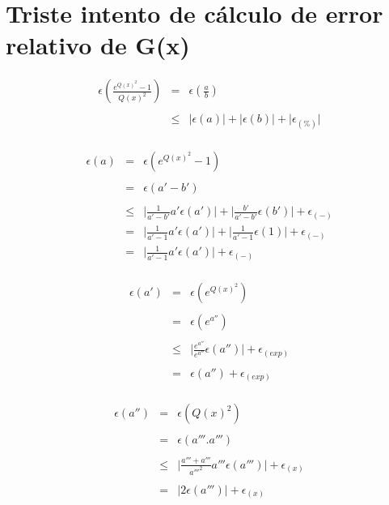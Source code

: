 \section{Triste intento de c\'alculo de error relativo de G(x)}

\begin{eqnarray}
\epsilon(\frac{e^{Q(x)^2}-1}{Q(x)^2}) & = & \epsilon(\frac{a}{b}) \nonumber \\
\nonumber \\
& \leq & \Big|\epsilon(a)\Big| + \Big|\epsilon(b)\Big| + \Big|\epsilon_{(\%)}\Big| \nonumber \\
\nonumber
\end{eqnarray}

\begin{eqnarray}
\epsilon(a) & = & \epsilon(e^{Q(x)^2} - 1) \nonumber \\
\nonumber \\
& = & \epsilon(a' - b') \nonumber \\
\nonumber \\
& \leq & \Big| \frac{1}{a' - b'} a' \epsilon(a') \Big| + \Big| \frac{b'}{a'-b'} \epsilon(b') \Big| + \epsilon_{(-)} \nonumber \\
\nonumber
& = & \Big| \frac{1}{a' - 1} a' \epsilon(a') \Big| + \Big| \frac{1}{a'-1} \epsilon(1) \Big| + \epsilon_{(-)} \nonumber \\
& = & \Big| \frac{1}{a' - 1} a' \epsilon(a') \Big| + \epsilon_{(-)} \nonumber \\
\nonumber
\end{eqnarray}

\begin{eqnarray}
\epsilon(a') & = & \epsilon( e^{Q(x)^2} ) \nonumber \\
\nonumber \\
& = & \epsilon(e^{a''}) \nonumber \\
\nonumber \\
& \leq & \Big| \frac{e^{a''}}{e^{a''}} \epsilon(a'') \Big| + \epsilon_{(exp)} \nonumber \\
\nonumber \\
& = & \epsilon(a'') + \epsilon_{(exp)} \nonumber \\
\nonumber
\end{eqnarray}

\begin{eqnarray}
\epsilon(a'') & = & \epsilon(Q(x)^2) \nonumber \\
\nonumber \\
& = & \epsilon(a'''.a''') \nonumber \\
\nonumber \\
& \leq & \Big| \frac{a''' + a'''}{a'''^2} a''' \epsilon(a''') \Big| + \epsilon_{(x)} \nonumber \\
\nonumber \\
& = & \Big| 2 \epsilon(a''') \Big| + \epsilon_{(x)} \nonumber \\
\nonumber
\end{eqnarray}

